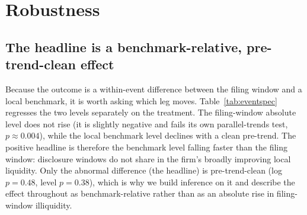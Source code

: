 \documentclass[12pt]{article}
\begin{document}
\section{Robustness}\label{sec:rob}
\subsection{The headline is a benchmark-relative, pre-trend-clean effect}\label{app:eventspec}
Because the outcome is a within-event difference between the filing window and a local benchmark, it is worth asking which leg moves. Table~\ref{tab:eventspec} regresses the two levels separately on the treatment. The filing-window absolute level does not rise (it is slightly negative and fails its own parallel-trends test, $p\approx0.004$), while the local benchmark level declines with a clean pre-trend. The positive headline is therefore the benchmark level falling faster than the filing window: disclosure windows do not share in the firm's broadly improving local liquidity. Only the abnormal difference (the headline) is pre-trend-clean (log $p=0.48$, level $p=0.38$), which is why we build inference on it and describe the effect throughout as benchmark-relative rather than as an absolute rise in filing-window illiquidity.


\end{document}
